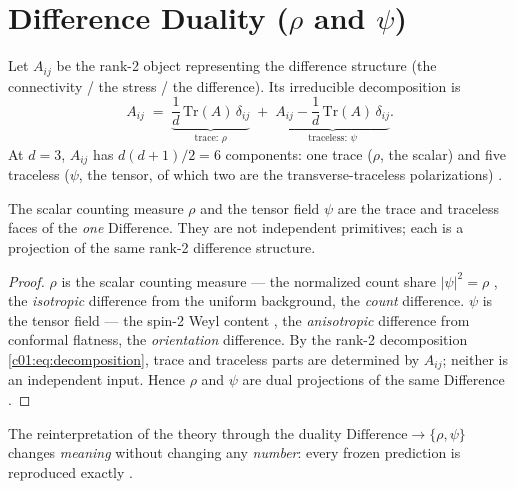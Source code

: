 \section{Difference Duality ($\rho$ and $\psi$)}
\label{c01:sec:duality}

\begin{definition}
\label{c01:def:two-faces}
Let $A_{ij}$ be the rank-2 object representing the difference structure (the connectivity /
the stress / the difference). Its irreducible decomposition is
\begin{equation}
\label{c01:eq:decomposition}
A_{ij} \;=\; \underbrace{\frac{1}{d}\,\mathrm{Tr}(A)\,\delta_{ij}}_{\text{trace: } \rho}
\;+\;\underbrace{A_{ij}-\frac{1}{d}\,\mathrm{Tr}(A)\,\delta_{ij}}_{\text{traceless: } \psi}.
\end{equation}
At $d=3$, $A_{ij}$ has $d(d+1)/2=6$ components: one trace ($\rho$, the scalar) and five
traceless ($\psi$, the tensor, of which two are the transverse-traceless polarizations)
\cite{c01:QG286}.
\end{definition}

\begin{theorem}
\label{c01:thm:duality}
The scalar counting measure $\rho$ and the tensor field $\psi$ are the trace and traceless
faces of the \emph{one} Difference. They are not independent primitives; each is a projection
of the same rank-2 difference structure.
\end{theorem}

\begin{proof}
$\rho$ is the scalar counting measure --- the normalized count share $|\psi|^2=\rho$
\cite{c01:QG216}, the \emph{isotropic} difference from the uniform background, the
\emph{count} difference. $\psi$ is the tensor field --- the spin-2 Weyl content
\cite{c01:QG285}, the \emph{anisotropic} difference from conformal flatness, the
\emph{orientation} difference. By the rank-2 decomposition \eqref{c01:eq:decomposition},
trace and traceless parts are determined by $A_{ij}$; neither is an independent input.
Hence $\rho$ and $\psi$ are dual projections of the same Difference \cite{c01:QG286}.
\end{proof}

\begin{corollary}
\label{c01:cor:duality-invariant}
The reinterpretation of the theory through the duality
$\text{Difference}\longrightarrow\{\rho,\psi\}$ changes \emph{meaning} without changing any
\emph{number}: every frozen prediction is reproduced exactly \cite{c01:QG301}.
\end{corollary}

